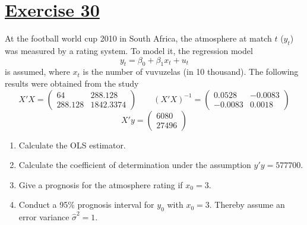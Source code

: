 \documentclass[captions=tableheading, 12pt, headings=small, parskip=half]{scrartcl}
\begin{document}
\section*{\underline{Exercise 30}}
At the football world cup 2010 in South Africa, the atmosphere at match $t$ ($y_t$) was measured by a rating system. To model it, the regression model
\[y_t = \beta_0 + \beta_1x_t + u_t\]
is assumed, where $x_t$ is the number of vuvuzelas (in 10 thousand). The following results were obtained from the study
\[
	X'X= \begin{pmatrix}
	64&288.128\\288.128&1842.3374
	\end{pmatrix}\qquad (X'X)^{-1} = \begin{pmatrix}
	0.0528&-0.0083\\-0.0083&0.0018
	\end{pmatrix}
\]\[
	X'y = \begin{pmatrix}
	6080\\27496
	\end{pmatrix}
\]
\begin{enumerate}[label = \alph*)]
	\item Calculate the OLS estimator.
	\item Calculate the coefficient of determination under the assumption $y'y = 577700$.
	\item Give a prognosis for the atmosphere rating if $x_0 = 3$.
	\item Conduct a 95\% prognosis interval for $y_0$ with $x_0 = 3$. Thereby assume an error variance $\hat{\sigma}^2 = 1$.
\end{enumerate}
\end{document}
